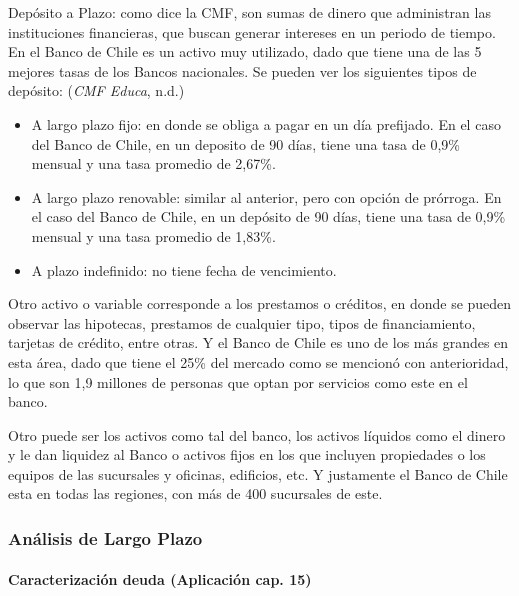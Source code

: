 \documentclass[
  letterpaper,
  DIV=11,
  numbers=noendperiod]{scrartcl}
\let\oldparagraph\paragraph
\renewcommand{\paragraph}[1]{\oldparagraph{#1}\mbox{}}
\begin{document}
Depósito a Plazo: como dice la CMF, son sumas de dinero que administran
las instituciones financieras, que buscan generar intereses en un
periodo de tiempo. En el Banco de Chile es un activo muy utilizado, dado
que tiene una de las 5 mejores tasas de los Bancos nacionales. Se pueden
ver los siguientes tipos de depósito: (\emph{CMF Educa}, n.d.)

\begin{itemize}
\item
  A largo plazo fijo: en donde se obliga a pagar en un día prefijado. En
  el caso del Banco de Chile, en un deposito de 90 días, tiene una tasa
  de 0,9\% mensual y una tasa promedio de 2,67\%.
\item
  A largo plazo renovable: similar al anterior, pero con opción de
  prórroga. En el caso del Banco de Chile, en un depósito de 90 días,
  tiene una tasa de 0,9\% mensual y una tasa promedio de 1,83\%.
\item
  A plazo indefinido: no tiene fecha de vencimiento.
\end{itemize}

Otro activo o variable corresponde a los prestamos o créditos, en donde
se pueden observar las hipotecas, prestamos de cualquier tipo, tipos de
financiamiento, tarjetas de crédito, entre otras. Y el Banco de Chile es
uno de los más grandes en esta área, dado que tiene el 25\% del mercado
como se mencionó con anterioridad, lo que son 1,9 millones de personas
que optan por servicios como este en el banco.

Otro puede ser los activos como tal del banco, los activos líquidos como
el dinero y le dan liquidez al Banco o activos fijos en los que incluyen
propiedades o los equipos de las sucursales y oficinas, edificios, etc.
Y justamente el Banco de Chile esta en todas las regiones, con más de
400 sucursales de este.

\hypertarget{anuxe1lisis-de-largo-plazo}{%
\subsubsection{Análisis de Largo
Plazo}\label{anuxe1lisis-de-largo-plazo}}

\hypertarget{caracterizaciuxf3n-deuda-aplicaciuxf3n-cap.-15}{%
\paragraph{Caracterización deuda (Aplicación cap.
15)}\label{caracterizaciuxf3n-deuda-aplicaciuxf3n-cap.-15}}
\end{document}
